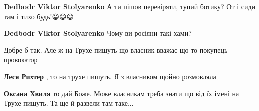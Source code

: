 \begin{itemize}
\begin{itemize}
 
\textbf{Dedbodr Viktor Stolyarenko} А ти пішов перевіряти, тупий ботику? От і сиди там і тихо будь!😀😀😀

 
\textbf{Dedbodr Viktor Stolyarenko} Чому ви росіяни такі хами?
\end{itemize}

 
Добре б так. Але ж на Трухе пишуть що власник вважає що то покупець провокатор

\begin{itemize}
 
\textbf{Леся Рихтер} , то на трухе пишуть. Я з власником щойно розмовляла

 
\textbf{Оксана Хвиля} то дай Боже. Може власникам треба знати що від їх імені на Трухе пишуть. Та ще й развели там таке...

 

\end{itemize}
\end{itemize}
